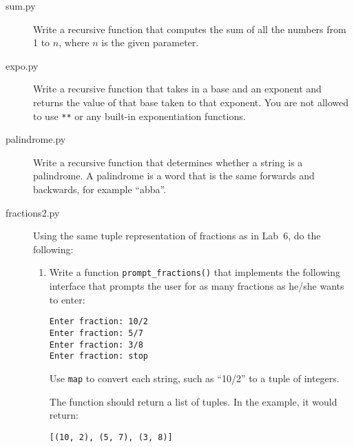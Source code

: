 \documentclass[11pt]{cselabheader}
\begin{document}
\begin{description}
  \item[sum.py] Write a recursive function that computes the sum of all the
    numbers from 1 to $n$, where $n$ is the given parameter.

  \item[expo.py] Write a recursive function that takes in a base and an exponent
    and returns the value of that base taken to that exponent. You are not
    allowed to use \lstinline{**} or any built-in exponentiation functions.

  \item[palindrome.py] Write a recursive function that determines whether a
    string is a palindrome. A palindrome is a word that is the same forwards and
    backwards, for example ``abba''.

  \item[fractions2.py] Using the same tuple representation of fractions as in
    Lab~6, do the following:

    \begin{enumerate}
      \item Write a function \lstinline!prompt_fractions()! that implements the
        following interface that prompts the user for as many fractions as
        he/she wants to enter:
        \begin{lstlisting}[style=bash]
Enter fraction: 10/2
Enter fraction: 5/7
Enter fraction: 3/8
Enter fraction: stop
        \end{lstlisting}

        Use \lstinline!map! to convert each string, such as ``10/2'' to a
        tuple of integers.

        The function should return a list of tuples. In the example, it would
        return:
        \begin{lstlisting}
[(10, 2), (5, 7), (3, 8)]
        \end{lstlisting}


\end{enumerate}
\end{description}
\end{document}
